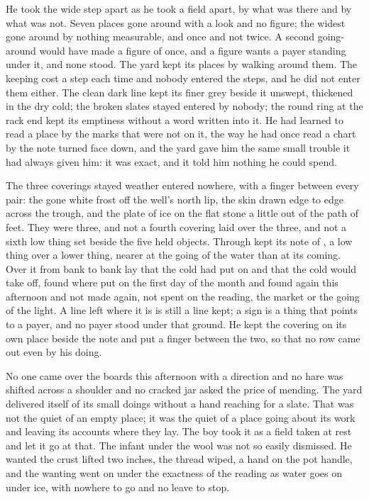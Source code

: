 He took the wide step apart as he took a field apart, by what was there and by what was not. Seven places gone around with a look and no figure; the widest gone around by nothing measurable, and once and not twice. A second going-around would have made a figure of once, and a figure wants a payer standing under it, and none stood. The yard kept its places by walking around them. The keeping cost a step each time and nobody entered the steps, and he did not enter them either. The clean dark line kept its finer grey beside it unswept, thickened in the dry cold; the broken slates stayed entered by nobody; the round ring at the rack end kept its emptiness without a word written into it. He had learned to read a place by the marks that were not on it, the way he had once read a chart by the note turned face down, and the yard gave him the same small trouble it had always given him: it was exact, and it told him nothing he could spend.

\scenebreak

The three coverings stayed weather entered nowhere, with a finger between every pair: the gone white frost off the well's north lip, the skin drawn edge to edge across the trough, and the plate of ice on the flat stone a little out of the path of feet. They were three, and not a fourth covering laid over the three, and not a sixth low thing set beside the five held objects. Through   kept its note of , a low thing over a lower thing, nearer at the going of the water than at its coming. Over it from bank to bank lay  that the cold had put on and that the cold would take off, found where put on the first day of the month and found again this afternoon and not made again, not spent on the reading, the market or the going of the light. A line left where it is is still a line kept; a sign is a thing that points to a payer, and no payer stood under that ground. He kept the covering on its own place beside the note and put a finger between the two, so that no row came out even by his doing.

No one came over the boards this afternoon with a direction and no hare was shifted across a shoulder and no cracked jar asked the price of mending. The yard delivered itself of its small doings without a hand reaching for a slate. That was not the quiet of an empty place; it was the quiet of a place going about its work and leaving its accounts where they lay. The boy took it as a field taken at rest and let it go at that. The infant under the wool was not so easily dismissed. He wanted the crust lifted two inches, the thread wiped, a hand on the pot handle, and the wanting went on under the exactness of the reading as water goes on under ice, with nowhere to go and no leave to stop.

